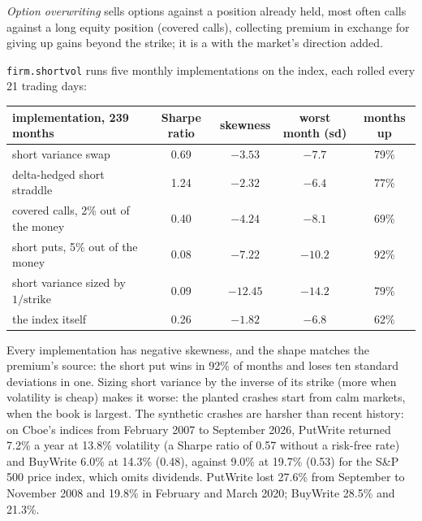 \begin{definition}\label{def:s2:harvesting-the-variance-risk-premium:overwrite}
\emph{Option overwriting} sells options against a position already held, most often calls against a long equity position
(covered calls), collecting premium in exchange for giving up gains beyond the strike; it is a  with the market's direction
added.
\end{definition}

\texttt{firm.shortvol} runs five monthly implementations on the index, each rolled every 21 trading days:

\begin{center}
\small
\begin{tabular}{@{}lcccc@{}}
\toprule
implementation, 239 months & Sharpe ratio & skewness & worst month (sd) & months up\\
\midrule
short variance swap & 0.69 & $-3.53$ & $-7.7$ & 79\%\\
delta-hedged short straddle & 1.24 & $-2.32$ & $-6.4$ & 77\%\\
covered calls, 2\% out of the money & 0.40 & $-4.24$ & $-8.1$ & 69\%\\
short puts, 5\% out of the money & 0.08 & $-7.22$ & $-10.2$ & 92\%\\
short variance sized by $1/\text{strike}$ & 0.09 & $-12.45$ & $-14.2$ & 79\%\\
the index itself & 0.26 & $-1.82$ & $-6.8$ & 62\%\\
\bottomrule
\end{tabular}
\end{center}

Every implementation has negative skewness, and the shape matches the premium's source: the short put wins in 92\% of months and loses ten standard
deviations in one. Sizing short variance by the inverse of its strike (more when volatility is cheap) makes it worse: the planted crashes start from
calm markets, when the book is largest. The synthetic crashes are harsher than recent history: on Cboe's indices from February 2007 to September 2026,
PutWrite returned 7.2\% a year at 13.8\% volatility (a Sharpe ratio of 0.57 without a risk-free rate) and BuyWrite 6.0\% at 14.3\% (0.48), against
9.0\% at 19.7\% (0.53) for the S\&P 500 price index, which omits dividends. PutWrite lost 27.6\% from September to November 2008 and 19.8\% in February
and March 2020; BuyWrite 28.5\% and 21.3\%.

